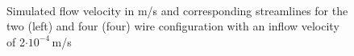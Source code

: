 \begin{figure}[H]
            \begin{subfigure}{0.49\textwidth}
                  \flushleft
          \end{subfigure}\hfill
        \begin{subfigure}{0.49\textwidth}
                \flushright
        \end{subfigure}
        \\
        
        \caption[Simulated flow velocity and corresponding streamlines around two and four wires]{Simulated flow velocity in m/s and corresponding streamlines for the two (left) and four (four) wire configuration with an inflow velocity of 2$\cdotp 10^{-4}$\,m/s}
        \label{fig:tw_fw_flow_field}
  \end{figure}  
 
